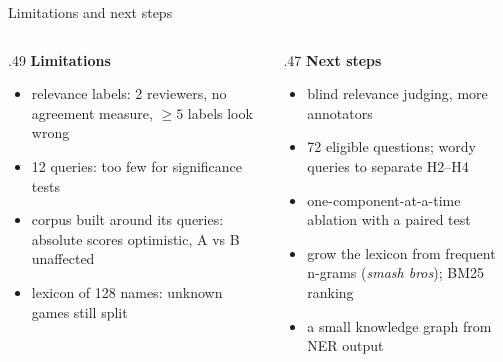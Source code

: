 \documentclass[
  aspectratio=169,
  10pt,
  t,
]{beamer}
\newcommand{\muted}[1]{\textcolor{muted}{#1}}
\begin{document}
\begin{frame}{Limitations and next steps}
\begin{columns}[T]
\begin{column}{.49\textwidth}
\textbf{Limitations}
\begin{itemize}
  \item relevance labels: 2 reviewers, no agreement measure, $\geq 5$ labels look wrong \parencite{voorhees2000variations}
  \item 12 queries: too few for significance tests
  \item corpus built around its queries: absolute scores optimistic, A vs B unaffected
  \item lexicon of 128 names: unknown games still split
\end{itemize}
\end{column}
\begin{column}{.47\textwidth}
\textbf{Next steps}
\begin{itemize}
  \item blind relevance judging, more annotators
  \item 72 eligible questions; wordy queries to separate H2--H4
  \item one-component-at-a-time ablation with a paired test
  \item grow the lexicon from frequent n-grams (\emph{smash bros}); BM25 ranking
  \item a small knowledge graph from NER output
\end{itemize}
\end{column}
\end{columns}
\end{frame}

\end{document}
